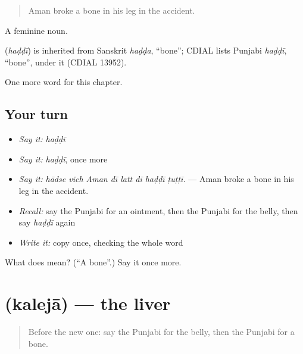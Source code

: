 \begin{quote}
Aman broke a bone in his leg in the accident.
\end{quote}

A feminine noun.

\begin{cousinweb}
\textbf{} (\emph{haḍḍī}) is inherited from Sanskrit \emph{haḍḍa}, \textquotedblleft{}bone\textquotedblright{}; CDIAL lists Punjabi \emph{haḍḍī}, \textquotedblleft{}bone\textquotedblright{}, under it (CDIAL 13952).
\end{cousinweb}

\begin{grammarlens}[title={What you've built}]
One more word for this chapter.
\end{grammarlens}

\subsection*{Your turn}
\begin{itemize}
\raggedright
  \item \emph{Say it:} \emph{haḍḍī}
  \item \emph{Say it:} \emph{haḍḍī}, once more
  \item \emph{Say it:} \emph{hādse vich Aman dī latt dī haḍḍī ṭuṭṭī.} — Aman broke a bone in his leg in the accident.
  \item \emph{Recall:} say the Punjabi for an ointment, then the Punjabi for the belly, then say \emph{haḍḍī} again
  \item \emph{Write it:} copy \textbf{} once, checking the whole word
\end{itemize}

\begin{tcolorbox}[breakable,colback=teal!4,colframe=teal!35!black,title={Before you move on}]
What does  mean? (\textquotedblleft{}A bone\textquotedblright{}.) Say it once more.
\end{tcolorbox}
\section[\texorpdfstring{\pa{ਕਲੇਜਾ} (kalejā)}{ਕਲੇਜਾ (kalejā)}]{ (kalejā) — the liver}

\label{lesson:PA-C323-kaleja}



\begin{quote}
Before the new one: say the Punjabi for the belly, then the Punjabi for a bone.
\end{quote}

